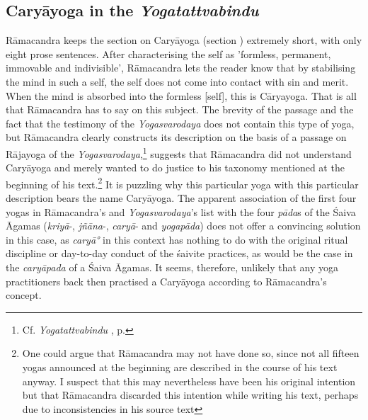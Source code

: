 \subsection{Caryāyoga in the \textit{Yogatattvabindu}}

Rāmacandra keeps the section on Caryāyoga (section ) extremely short, with only eight prose sentences. After characterising the self as 'formless, permanent, immovable and indivisible', Rāmacandra lets the reader know that by stabilising the mind in such a self, the self does not come into contact with sin and merit. When the mind is absorbed into the formless [self], this is Cāryayoga. That is all that Rāmacandra has to say on this subject. The brevity of the passage and the fact that the testimony of the \textit{Yogasvarodaya} does not contain this type of yoga, but Rāmacandra clearly constructs its description on the basis of a passage on Rājayoga of the \textit{Yogasvarodaya},\footnote{Cf. \textit{Yogatattvabindu} , p. \pageref{caryayoga}} suggests that Rāmacandra did not understand Caryāyoga and merely wanted to do justice to his taxonomy mentioned at the beginning of his text.\footnote{One could argue that Rāmacandra may not have done so, since not all fifteen yogas announced at the beginning are described in the course of his text anyway. I suspect that this may nevertheless have been his original intention but that Rāmacandra discarded this intention while writing his text, perhaps due to inconsistencies in his source text} It is puzzling why this particular yoga with this particular description bears the name Caryāyoga. The apparent association of the first four yogas in Rāmacandra's and \textit{Yogasvarodaya}'s list with the four \textit{pāda}s of the Śaiva Āgamas (\textit{kriyā}-, \textit{jñāna}-, \textit{caryā}- and \textit{yogapāda}) does not offer a convincing solution in this case, as \textit{caryā°} in this context has nothing to do with the original ritual discipline or day-to-day conduct of the śaivite practices, as would be the case in the \textit{caryāpada} of a Śaiva Āgamas. It seems, therefore, unlikely that any yoga practitioners back then practised a Caryāyoga according to Rāmacandra's concept. 

